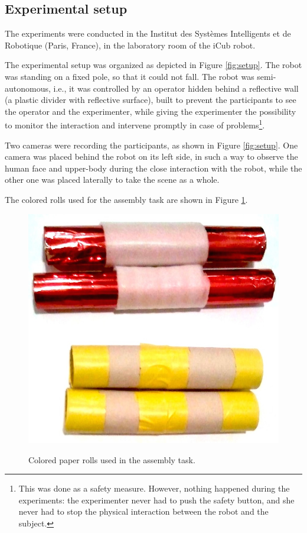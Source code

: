 \documentclass[twocolumn]{svjour3}          %
\begin{document}
\subsection{Experimental setup}\label{sec:experimentalsetting}

The experiments were conducted in the Institut des Systèmes Intelligents et de Robotique (Paris, France), in the laboratory room of the iCub robot. 

The experimental setup was organized as depicted in Figure \ref{fig:setup}. 
The robot was standing on a fixed pole, so that it could not fall.
The robot was semi-autonomous, i.e., it was controlled by an operator hidden behind 
a reflective wall (a plastic divider with reflective surface), built  
to prevent the participants to see the operator and the experimenter, while giving the experimenter the possibility to monitor the interaction and intervene promptly in case of problems\footnote{This was done as a safety measure. However, nothing happened during the experiments: the experimenter never had to push the safety button, and she never had to stop the physical interaction between the robot and the subject.}. 

Two cameras were recording the participants, as shown in Figure \ref{fig:setup}. 
One camera was placed behind the robot on its left side, in such a way to observe the human face and upper-body during the close interaction with the robot, while the other one was placed laterally to take the scene as a whole.


The colored rolls used for the assembly task are shown in Figure \ref{fig:rolls}.




\begin{figure}[ht]
\centering
{
\includegraphics[width=0.5\hsize]{figures/tubes.jpg}
}
\caption{Colored paper rolls used in the assembly task.}
\label{fig:rolls}
\end{figure}
\end{document}
